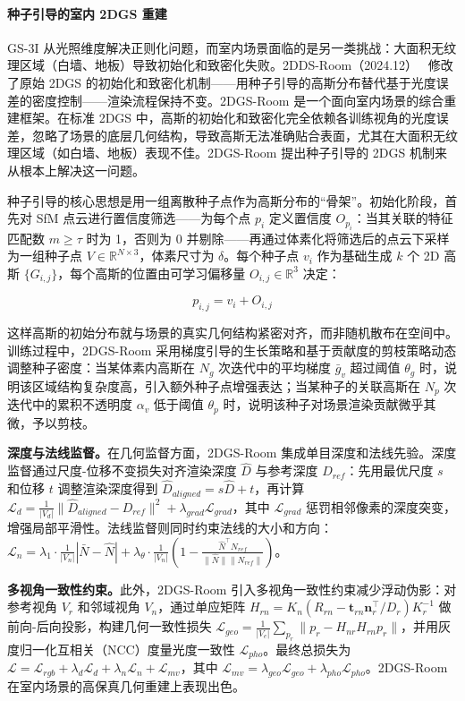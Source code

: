 \paragraph{种子引导的室内 2DGS 重建}

GS-3I 从光照维度解决正则化问题，而室内场景面临的是另一类挑战：大面积无纹理区域（白墙、地板）导致初始化和致密化失败。2DDS-Room（2024.12）~\cite{2412_03428} 修改了原始 2DGS 的初始化和致密化机制——用种子引导的高斯分布替代基于光度误差的密度控制——渲染流程保持不变。2DGS-Room 是一个面向室内场景的综合重建框架。在标准 2DGS 中，高斯的初始化和致密化完全依赖各训练视角的光度误差，忽略了场景的底层几何结构，导致高斯无法准确贴合表面，尤其在大面积无纹理区域（如白墙、地板）表现不佳。2DGS-Room 提出种子引导的 2DGS 机制来从根本上解决这一问题。

种子引导的核心思想是用一组离散种子点作为高斯分布的“骨架”。初始化阶段，首先对 SfM 点云进行置信度筛选——为每个点 $p_i$ 定义置信度 $O_{p_i}$：当其关联的特征匹配数 $m \geq \tau$ 时为 1，否则为 0 并剔除——再通过体素化将筛选后的点云下采样为一组种子点 $V \in \mathbb{R}^{N \times 3}$，体素尺寸为 $\delta$。每个种子点 $v_i$ 作为基础生成 $k$ 个 2D 高斯 $\{G_{i,j}\}$，每个高斯的位置由可学习偏移量 $O_{i,j} \in \mathbb{R}^3$ 决定：

\begin{equation}
p_{i,j} = v_i + O_{i,j}
\end{equation}

这样高斯的初始分布就与场景的真实几何结构紧密对齐，而非随机散布在空间中。训练过程中，2DGS-Room 采用梯度引导的生长策略和基于贡献度的剪枝策略动态调整种子密度：当某体素内高斯在 $N_g$ 次迭代中的平均梯度 $\bar{g}_v$ 超过阈值 $\theta_g$ 时，说明该区域结构复杂度高，引入额外种子点增强表达；当某种子的关联高斯在 $N_p$ 次迭代中的累积不透明度 $\alpha_v$ 低于阈值 $\theta_p$ 时，说明该种子对场景渲染贡献微乎其微，予以剪枝。

\textbf{深度与法线监督。}在几何监督方面，2DGS-Room 集成单目深度和法线先验。深度监督通过尺度-位移不变损失对齐渲染深度 $\hat{D}$ 与参考深度 $D_{ref}$：先用最优尺度 $s$ 和位移 $t$ 调整渲染深度得到 $\hat{D}_{aligned} = s\hat{D} + t$，再计算 $\mathcal{L}_d = \frac{1}{|V_d|} \|\hat{D}_{aligned} - D_{ref}\|^2 + \lambda_{grad} \mathcal{L}_{grad}$，其中 $\mathcal{L}_{grad}$ 惩罚相邻像素的深度突变，增强局部平滑性。法线监督则同时约束法线的大小和方向：$\mathcal{L}_n = \lambda_1 \cdot \frac{1}{|V_n|} |\bar{N} - \hat{N}| + \lambda_{\theta} \cdot \frac{1}{|V_n|}(1 - \frac{\hat{N}^\top N_{ref}}{\|\hat{N}\| \|N_{ref}\|})$。

\textbf{多视角一致性约束。}此外，2DGS-Room 引入多视角一致性约束减少浮动伪影：对参考视角 $V_r$ 和邻域视角 $V_n$，通过单应矩阵 $H_{rn} = K_n(R_{rn} - \mathbf{t}_{rn}\mathbf{n}_r^\top / D_r)K_r^{-1}$ 做前向-后向投影，构建几何一致性损失 $\mathcal{L}_{geo} = \frac{1}{|V_e|} \sum_{p_r} \|p_r - H_{nr}H_{rn}p_r\|$，并用灰度归一化互相关（NCC）度量光度一致性 $\mathcal{L}_{pho}$。最终总损失为 $\mathcal{L} = \mathcal{L}_{rgb} + \lambda_d \mathcal{L}_d + \lambda_n \mathcal{L}_n + \mathcal{L}_{mv}$，其中 $\mathcal{L}_{mv} = \lambda_{geo}\mathcal{L}_{geo} + \lambda_{pho}\mathcal{L}_{pho}$。2DGS-Room 在室内场景的高保真几何重建上表现出色。

